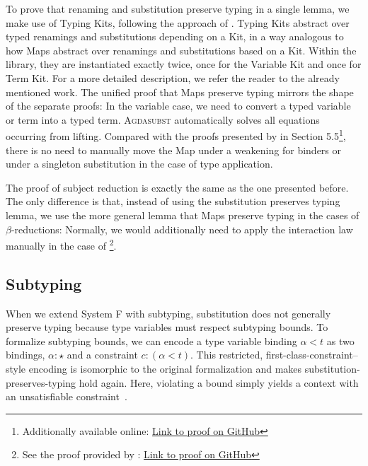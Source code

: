 \documentclass[screen,nonacm]{acmart}
\begin{document}
\noindent \begin{minipage}[t]{0.48\linewidth}
      \small
      \raggedright{}
      \SFLookupSH{}
\end{minipage}
\begin{minipage}[t]{0.48\linewidth}
      \small
      \raggedright{}
      \SFTraversalSH{}
\end{minipage}

\noindent To prove that renaming and substitution preserve typing in a single lemma, we
make use of Typing Kits, following the approach of \citet{saffrich:LIPIcs.ITP.2024.32}. Typing
Kits abstract over typed renamings and substitutions depending on a Kit, in a
way analogous to how Maps abstract over renamings and substitutions based on
a Kit. Within the library, they are instantiated exactly twice, once for the
Variable Kit and once for Term Kit. For a
more detailed description, we refer the reader to the already mentioned work.
The unified proof that Maps preserve typing mirrors the shape of the separate
proofs: \SFSPT{}In the variable case, we need to convert a typed
variable or term into a typed term. \textsc{Agdasubst} automatically solves all equations occurring
from lifting. Compared with the proofs presented by
\citet{saffrich:LIPIcs.ITP.2024.32} in Section 5.5\footnote{Additionally available online: \href{https://github.com/m0rphism/kitty/blob/bc86948c60f2d827593ad23e539197f9660178aa/src/Kitty/Examples/SystemF/SubjectReduction.agda\#L9}{Link to proof on GitHub}}, there is no need to
manually move the Map under a weakening for binders or under a singleton
substitution in the case of type application.

The proof of subject reduction is exactly the same as the one presented before.
The only difference is that, instead of using the substitution preserves typing
lemma, we use the more general lemma that Maps preserve typing in the cases of
$β$-reductions: \SFSR{} Normally, we would additionally need to apply the
interaction law manually in the case of \footnote{See the
      proof provided by \citet{saffrich:LIPIcs.ITP.2024.32}:
      \href{https://github.com/m0rphism/kitty/blob/bc86948c60f2d827593ad23e539197f9660178aa/src/Kitty/Examples/SystemF/SubjectReduction.agda\#L32}{Link
            to proof on GitHub}}.

\subsection*{Subtyping}
When we extend System F with subtyping\cite{CARDELLI19944}, substitution does
not generally preserve typing because type variables must respect subtyping
bounds. To formalize subtyping bounds, we can encode a type variable binding $α
      < t$ as two bindings, $α : \star$ and a constraint $c : (α < t)$. This
restricted, first-class-constraint–style encoding is isomorphic to the original
formalization and makes substitution-preserves-typing hold again. Here,
violating a bound simply yields a context with an unsatisfiable
constraint~\cite{saffrich:LIPIcs.ITP.2024.32}.
\end{document}
